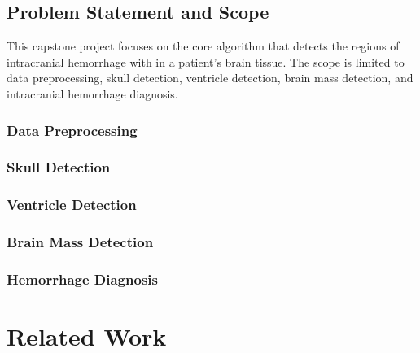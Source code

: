 \documentclass [11pt, proquest] {uwthesis}[2020/02/24]
\begin{document}
\section{Problem Statement and Scope}
This capstone project focuses on the core algorithm that detects the regions of intracranial
hemorrhage with in a patient's brain tissue. The scope is limited to data preprocessing, skull detection,
ventricle detection, brain mass detection, and intracranial hemorrhage diagnosis.

\subsection{Data Preprocessing}





\subsection{Skull Detection}


\subsection{Ventricle Detection}


\subsection{Brain Mass Detection}



\subsection{Hemorrhage Diagnosis}





\chapter {Related Work}
\end{document}
